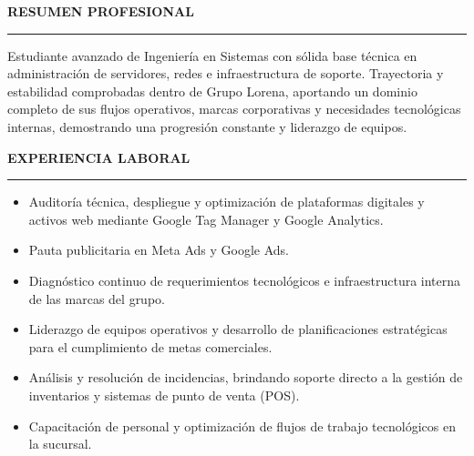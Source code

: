 \documentclass[10pt,a4paper,ragged2e]{altacv}
\renewcommand{\cvsection}[2][]{%
  \vspace{0.8ex}%
  \ifstrequal{#1}{}{}{\marginpar{\vspace*{\dimexpr1pt-\baselineskip}\raggedright}}%
  {\color{heading}\Large\bfseries\MakeUppercase{#2}}\\[-1.2ex]%
  {\color{heading}\rule{\linewidth}{1.2pt}\par}\vspace{0.8ex}
}
\renewcommand{\divider}{\vspace{0.2ex}\textcolor{body!30}{\hdashrule{\linewidth}{0.4pt}{0.5ex}}\vspace{0.2ex}}
\begin{document}

\begin{fullwidth}
\makecvheader

\cvsection{RESUMEN PROFESIONAL}

Estudiante avanzado de Ingeniería en Sistemas con sólida base técnica en administración de servidores, redes e infraestructura de soporte. Trayectoria y estabilidad comprobadas dentro de Grupo Lorena, aportando un dominio completo de sus flujos operativos, marcas corporativas y necesidades tecnológicas internas, demostrando una progresión constante y liderazgo de equipos.
\end{fullwidth}


\marginpar{\vspace*{\dimexpr1pt-\baselineskip}\raggedright\cvsidebar}

\cvsection{EXPERIENCIA LABORAL}

\begin{itemize}
  \item Auditoría técnica, despliegue y optimización de plataformas digitales y activos web mediante Google Tag Manager y Google Analytics.
  \item Pauta publicitaria en Meta Ads y Google Ads.
  \item Diagnóstico continuo de requerimientos tecnológicos e infraestructura interna de las marcas del grupo.
\end{itemize}
\divider

\begin{itemize}
  \item Liderazgo de equipos operativos y desarrollo de planificaciones estratégicas para el cumplimiento de metas comerciales.
  \item Análisis y resolución de incidencias, brindando soporte directo a la gestión de inventarios y sistemas de punto de venta (POS).
  \item Capacitación de personal y optimización de flujos de trabajo tecnológicos en la sucursal.
\end{itemize}
\divider
\end{document}
